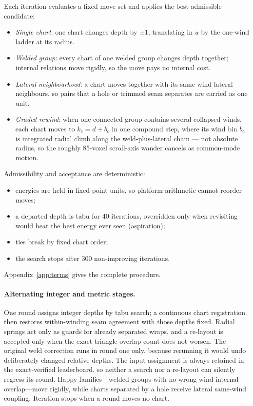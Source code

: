 Each iteration evaluates a fixed move set and applies the best admissible candidate:
\begin{itemize}
  \setlength{\itemsep}{1pt}
  \item {\em Single chart}: one chart changes depth by $\pm1$, translating in $u$ by the one-wind ladder at its radius.
  \item {\em Welded group}: every chart of one welded group changes depth together; internal relations move rigidly, so the move pays no internal cost.
  \item {\em Lateral neighbourhood}: a chart moves together with its same-wind lateral neighbours, so pairs that a hole or trimmed seam separates are carried as one unit.
  \item {\em Graded rewind}: when one connected group contains several collapsed winds, each chart moves to $k_c=d+b_c$ in one compound step, where its wind bin $b_c$ is integrated radial climb along the weld-plus-lateral chain --- not absolute radius, so the roughly 85-voxel scroll-axis wander cancels as common-mode motion.
\end{itemize}
Admissibility and acceptance are deterministic:
\begin{itemize}
  \setlength{\itemsep}{1pt}
  \item energies are held in fixed-point units, so platform arithmetic cannot reorder moves;
  \item a departed depth is tabu for 40 iterations, overridden only when revisiting would beat the best energy ever seen (aspiration);
  \item ties break by fixed chart order;
  \item the search stops after 300 non-improving iterations.
\end{itemize}
Appendix~\ref{app:terms} gives the complete procedure.

\paragraph{Alternating integer and metric stages.} One round assigns integer depths by tabu search; a continuous chart registration then restores within-winding seam agreement with those depths fixed. Radial springs act only as guards for already separated wraps, and a re-layout is accepted only when the exact triangle-overlap count does not worsen. The original weld correction runs in round one only, because rerunning it would undo deliberately changed relative depths. The input assignment is always retained in the exact-verified leaderboard, so neither a search nor a re-layout can silently regress its round. Happy families---welded groups with no wrong-wind internal overlap---move rigidly, while charts separated by a hole receive lateral same-wind coupling. Iteration stops when a round moves no chart.

